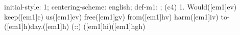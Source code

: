 initial-style: 1;
centering-scheme: english;
def-m1: \grealign;
(c4) 1. Would([em1]ev) keep([em1]c) us([em1]ev) free([em1]gv) from([em1]hv) harm([em1]iv) to-([em1]h)day.([em1]h) (::) ([em1]hi)([em1]hgh)